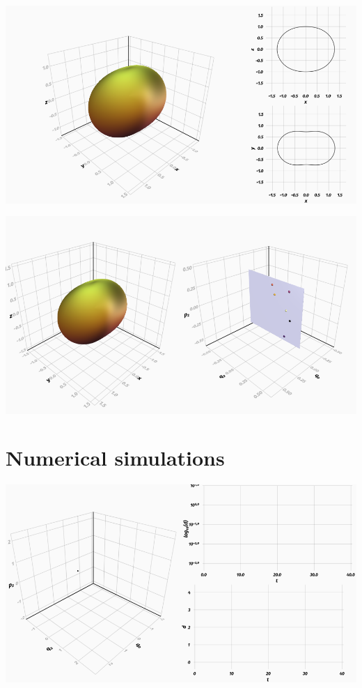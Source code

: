 \documentclass{beamer}
\begin{document}
\begin{frame}
	\includegraphics[width=\textwidth]{nucleus-with-sections}
\end{frame}


\begin{frame}
	\includegraphics[width=\textwidth]{nucleus-with-poincare}
\end{frame}

\section{Numerical simulations}


\begin{frame}
	\includegraphics[width=\textwidth]{dist-with-log}
\end{frame}
\end{document}
